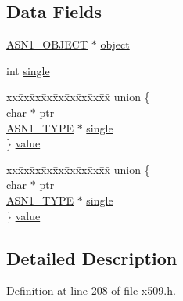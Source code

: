 \subsection*{Data Fields}
\begin{DoxyCompactItemize}
\item 
\hyperlink{crypto_2ossl__typ_8h_ae3fda0801e4c8e250087052bafb3ce2e}{A\+S\+N1\+\_\+\+O\+B\+J\+E\+CT} $\ast$ \hyperlink{structx509__attributes__st_aac268aa1904733da5af63d97def610c4}{object}
\item 
int \hyperlink{structx509__attributes__st_a781b6b8726f9ad40945abcfa8667812f}{single}
\item 
\begin{tabbing}
xx\=xx\=xx\=xx\=xx\=xx\=xx\=xx\=xx\=\kill
union \{\\
\>char $\ast$ \hyperlink{structx509__attributes__st_a935adc2e417a61d7eb6f04efb18ba031}{ptr}\\
\>\hyperlink{crypto_2asn1_2asn1_8h_a7895e03d9fee2bc4963faf2a31a9439e}{ASN1\_TYPE} $\ast$ \hyperlink{structx509__attributes__st_a93f3cc934affab137fbb62c9191b8458}{single}\\
\} \hyperlink{structx509__attributes__st_a832e7da9e8ee60de1ec9d51e8167494a}{value}\\

\end{tabbing}\item 
\begin{tabbing}
xx\=xx\=xx\=xx\=xx\=xx\=xx\=xx\=xx\=\kill
union \{\\
\>char $\ast$ \hyperlink{structx509__attributes__st_a935adc2e417a61d7eb6f04efb18ba031}{ptr}\\
\>\hyperlink{crypto_2asn1_2asn1_8h_a7895e03d9fee2bc4963faf2a31a9439e}{ASN1\_TYPE} $\ast$ \hyperlink{structx509__attributes__st_a93f3cc934affab137fbb62c9191b8458}{single}\\
\} \hyperlink{structx509__attributes__st_abb5eb07460df18cef81d7f6314308536}{value}\\

\end{tabbing}\end{DoxyCompactItemize}


\subsection{Detailed Description}


Definition at line 208 of file x509.\+h.



